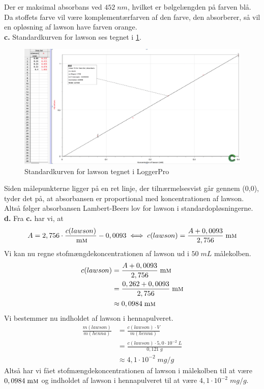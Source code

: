 \documentclass{report}
\begin{document}
Der er maksimal absorbans ved $452 \;\unit{nm} $, hvilket er bølgelængden på farven blå.
Da stoffets farve vil være komplementærfarven af den farve, den absorberer, så vil en opløsning af lawson have farven orange.\\[1ex]
\textbf{c.}
Standardkurven for lawson ses tegnet i \cref{fig:absorbans}.
\begin{figure}[H]
\begin{center}
  \includegraphics[width=\textwidth]{absorbans.png}
\end{center}
\caption{Standardkurven for lawson tegnet i LoggerPro}
\label{fig:absorbans}
\end{figure}
Siden målepunkterne ligger på en ret linje, der tilnærmelsesvist går gennem (0,0), tyder det på, at absorbansen er proportional med koncentrationen af lawson.
Altså følger absorbansen Lambert-Beers lov for lawson i standardopløsningerne.\\[1ex]
\textbf{d.}
Fra \textbf{c.} har vi, at 
\begin{equation*}
\begin{split}
  A=2,756 \cdot \frac{c(lawson)}{\;\unit{m \textsc{m}}} - 0,0093 \iff c(lawson)= \frac{A+ 0,0093}{2,756} \;\unit{m \textsc{m}} 
\end{split}
\end{equation*}
Vi kan nu regne stofmængdekoncentrationen af lawson ud i $50 \;\unit{mL} $ målekolben. 
\begin{equation*}
\begin{split}
  c(lawson)&= \frac{A+ 0,0093}{2,756} \;\unit{m \textsc{m}} \\ 
  &= \frac{0,262 + 0,0093}{2,756} \;\unit{m \textsc{m}} \\ 
  &\approx 0,0984 \;\unit{m \textsc{m} } 
\end{split}
\end{equation*}
Vi bestemmer nu indholdet af lawson i hennapulveret.
\begin{equation*}
\begin{split}
  \frac{m(lawson)}{m(henna)}&= \frac{c(lawson) \cdot V}{m(henna)}\\ 
  &=\frac{c(lawson) \cdot 5,0 \cdot 10^{-2} \;\unit{L} }{0,121 \;\unit{g} }\\ 
  &\approx 4,1 \cdot 10^{-2} \;\unit{mg/g} 
\end{split}
\end{equation*}
Altså har vi fået stofmængdekoncentrationen af lawson i målekolben til at være $0,0984 \;\unit{m \textsc{m}} $ og indholdet af lawson i hennapulveret til at være $4,1 \cdot 10^{-2} \;\unit{mg/g} $.
\end{document}
